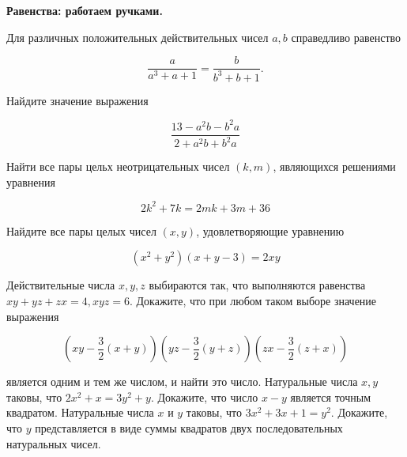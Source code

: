 \centerline{\bf \Huge Равенства: работаем ручками.}


 Для различных положительных действительных чисел $a, b$ справедливо равенство

$$
\frac{a}{a^3+a+1}=\frac{b}{b^3+b+1} .
$$


Найдите значение выражения

$$
\frac{13-a^2 b-b^2 a}{2+a^2 b+b^2 a}
$$

Найти все пары цельх неотрицательных чисел $(k, m)$, являющихся решениями уравнения

$$
2 k^2+7 k=2 m k+3 m+36
$$

Найдите все пары целых чисел $(x, y)$, удовлетворяющие уравнению

$$
\left(x^2+y^2\right)(x+y-3)=2 x y
$$

 Действительные числа $x, y, z$ выбираются так, что выполняются равенства $x y+y z+z x=4, x y z=6$. Докажите, что при любом таком выборе значение выражения

$$
\left(x y-\frac{3}{2}(x+y)\right)\left(y z-\frac{3}{2}(y+z)\right)\left(z x-\frac{3}{2}(z+x)\right)
$$


является одним и тем же числом, и найти это число.
Натуральные числа $x, y$ таковы, что $2 x^2+x=3 y^2+y$. Докажите, что число $x-y$ является точным квадратом.
 Натуральные числа $x$ и $y$ таковы, что $3 x^2+3 x+1=y^2$. Докажите, что $y$ представляется в виде суммы квадратов двух последовательных натуральных чисел.